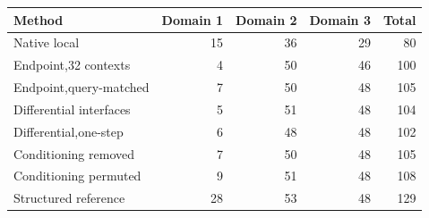 \begin{tabular}{lrrrr}
\toprule
Method & Domain 1 & Domain 2 & Domain 3 & Total\\
\midrule
Native local & 15 & 36 & 29 & 80 \\
Endpoint,32 contexts & 4 & 50 & 46 & 100 \\
Endpoint,query-matched & 7 & 50 & 48 & 105 \\
Differential interfaces & 5 & 51 & 48 & 104 \\
Differential,one-step & 6 & 48 & 48 & 102 \\
Conditioning removed & 7 & 50 & 48 & 105 \\
Conditioning permuted & 9 & 51 & 48 & 108 \\
Structured reference & 28 & 53 & 48 & 129 \\
\bottomrule
\end{tabular}

